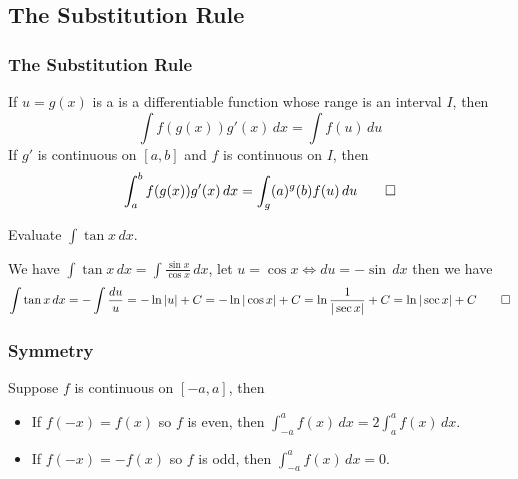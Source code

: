 \subsection{The Substitution Rule}
\subsubsection{The Substitution Rule}
\begin{theorem}
    If \(u=g(x)\) is a is a differentiable function whose range is an interval
    \(I\), then \[\int f(g(x))g'(x)\,dx=\int f(u)\,du\]
    If \(g'\) is continuous on \([a,b]\) and \(f\) is continuous on \(I\),
    then \[\int_a^b f(g(x))g'(x)\,dx=\int_g(a)^g(b) f(u)\,du\qedhere\]
\end{theorem}
\begin{problem}
    Evaluate \(\displaystyle{\int\tan x\,dx}\).
\end{problem}
\begin{solution}
    We have \(\displaystyle{\int\tan x\,dx=\int\frac{\sin x}{\cos x}}\,dx\),
    let \(u=\cos x \iff du=-\sin\,dx\) then we have
    \[\int\tan x\,dx=-\int\frac{du}{u}=-\ln|u|+C=-\ln|\cos x|+C
    =\ln\frac{1}{|\sec x|}+C=\ln|\sec x|+C\qedhere\]
\end{solution}

\subsubsection{Symmetry}
\begin{theorem}
    Suppose \(f\) is continuous on \([-a,a]\), then
    \begin{itemize}
        \item If \(f(-x)=f(x)\) so \(f\) is even, then
        \(\displaystyle{\int_{-a}^a f(x)\,dx=2\int_a^a f(x)\,dx}\).
        \item If \(f(-x)=-f(x)\) so \(f\) is odd, then
        \(\displaystyle{\int_{-a}^a f(x)\,dx=0}\).\qedhere
    \end{itemize}
\end{theorem}